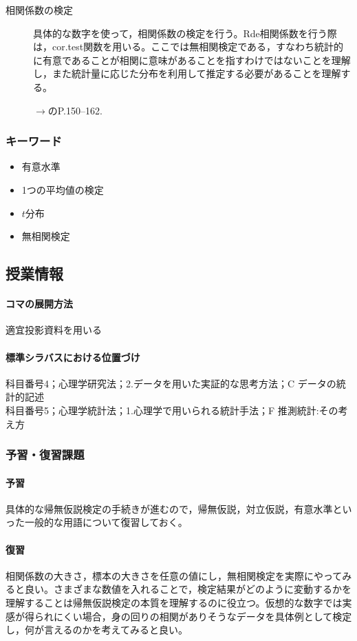 \begin{description}

	\item[相関係数の検定]具体的な数字を使って，相関係数の検定を行う。Rde相関係数を行う際は，cor.test関数を用いる。ここでは無相関検定である，すなわち統計的に有意であることが相関に意味があることを指すわけではないことを理解し，また統計量に応じた分布を利用して推定する必要があることを理解する。
	      \begin{flushright}
		      $\to$\citet{Shimizu2021}のP.150--162.
	      \end{flushright}

\end{description}
\subsubsection{キーワード}
\begin{itemize}
	\item 有意水準
	\item 1つの平均値の検定
	\item $t$分布
	\item 無相関検定
\end{itemize}
\subsection{授業情報}
\paragraph{コマの展開方法}
適宜投影資料を用いる
\paragraph{標準シラバスにおける位置づけ}
科目番号4；心理学研究法；2.データを用いた実証的な思考方法；C データの統計的記述\\
科目番号5；心理学統計法；1.心理学で用いられる統計手法；F 推測統計:その考え方
\subsubsection{予習・復習課題}
\paragraph{予習}
具体的な帰無仮説検定の手続きが進むので，帰無仮説，対立仮説，有意水準といった一般的な用語について復習しておく。
\paragraph{復習}
相関係数の大きさ，標本の大きさを任意の値にし，無相関検定を実際にやってみると良い。さまざまな数値を入れることで，検定結果がどのように変動するかを理解することは帰無仮説検定の本質を理解するのに役立つ。仮想的な数字では実感が得られにくい場合，身の回りの相関がありそうなデータを具体例として検定し，何が言えるのかを考えてみると良い。